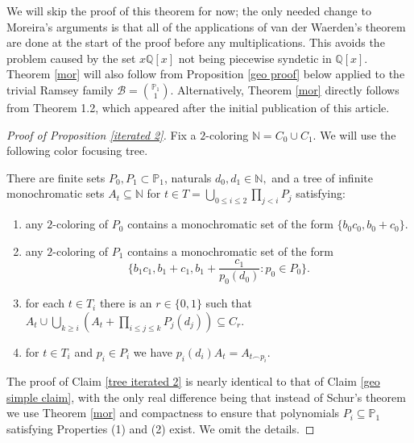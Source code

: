 \documentclass[tocmacros]{daj}
\begin{document}
We will skip the proof of this theorem for now; the only needed change to Moreira's arguments is that all of the applications of van der Waerden's theorem are done at the start of the proof before any multiplications.  This avoids the problem caused by the set $x\mathbb{Q}[x]$ not being piecewise syndetic in $\mathbb{Q}[x].$   Theorem \ref{mor} will also follow from Proposition \ref{geo proof} below applied to the trivial Ramsey family $\mathcal{B}=\binom{\mathbb{P}_1}{1}.$  Alternatively, Theorem \ref{mor} directly follows from \cite{alweiss2024monochromatic} Theorem 1.2, which appeared after the initial publication of this article. 

\begin{proof}[Proof of Proposition \ref{iterated 2}]
Fix a $2$-coloring $\mathbb{N}=C_0\cup C_1.$ We will use the following color focusing tree.

\begin{claim}\label{tree iterated 2}
There are finite sets $P_0,P_1\subset \mathbb{P}_1$, naturals $d_0,d_1\in \mathbb{N},$ and a tree of infinite monochromatic sets $A_t\subseteq \mathbb{N}$ for $t\in T=\bigcup_{0\leq i\leq 2}\prod_{j<i}P_j$ satisfying:

\begin{enumerate}
    \item any $2$-coloring of $P_0$ contains a monochromatic set of the form $\{b_0c_0, b_0+c_0\}.$
    
    \item any $2$-coloring of $P_1$ contains a monochromatic set of the form $$\{b_1c_1, b_1+c_1, b_1+\frac{c_1}{p_0(d_0)}: p_0\in P_0\}.$$
    
    \item for each $t\in T_i$ there is an $r\in \{0,1\}$ such that $A_t\cup\bigcup_{k\geq i}(A_t+\prod_{i\leq j\leq k}P_j(d_j))\subseteq C_r.$
    
    \item for $t\in T_i$ and $p_i\in P_i$ we have $p_i(d_i)A_t=A_{t\smallfrown p_i}.$
\end{enumerate}
\end{claim}

The proof of Claim \ref{tree iterated 2} is nearly identical to that of Claim \ref{geo simple claim}, with the only real difference being that instead of Schur's theorem we use Theorem \ref{mor} and compactness to ensure that polynomials $P_i\subseteq \mathbb{P}_1$  satisfying Properties (1) and (2) exist.  We omit the details.




\end{proof}
\end{document}
